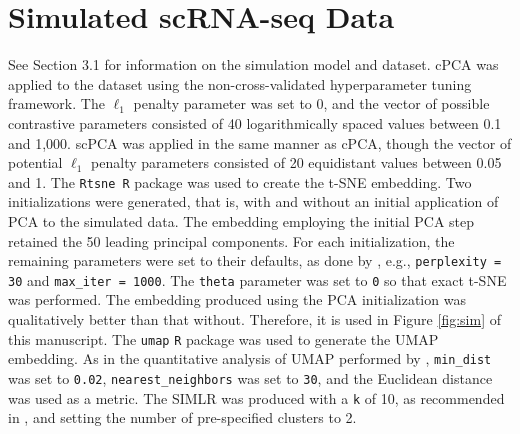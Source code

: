 \documentclass{article}
\begin{document}
\FloatBarrier

\newpage

\section{Simulated scRNA-seq Data}\label{sup_sim}

See Section 3.1 %
for information on the simulation model and dataset. cPCA was applied to the dataset using the non-cross-validated hyperparameter tuning framework. The $\ell_1$ penalty parameter was set to 0, and the vector of possible contrastive parameters consisted of 40 logarithmically spaced values between 0.1 and 1,000. scPCA was applied in the same manner as cPCA, though the vector of potential $\ell_1$ penalty parameters consisted of 20 equidistant values between 0.05 and 1. The \texttt{Rtsne R} package was used to create the t-SNE embedding. Two initializations were generated, that is, with and without an initial application of PCA to the simulated data. The embedding employing the initial PCA step retained the 50 leading principal components. For each initialization, the remaining parameters were set to their defaults, as done by \citet{Becht2019}, e.g., \texttt{perplexity = 30} and \texttt{max\_iter = 1000}. The \texttt{theta} parameter was set to \texttt{0} so that exact t-SNE was performed. The embedding produced using the PCA initialization was qualitatively better than that without. Therefore, it is used in Figure \ref{fig:sim} of this manuscript. The \texttt{umap} \texttt{R} package was used to generate the UMAP embedding. As in the quantitative analysis of UMAP performed by \citet{Becht2019}, \texttt{min\_dist} was set to \texttt{0.02}, \texttt{nearest\_neighbors} was set to \texttt{30}, and the Euclidean distance was used as a metric. The SIMLR was produced with a \texttt{k} of 10, as recommended in \citep{Wang2017}, and setting the number of pre-specified clusters to 2.
\end{document}
